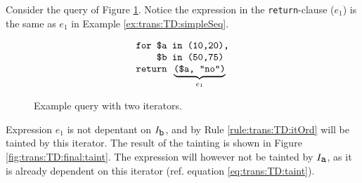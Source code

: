 \begin{myExample}
Consider the query of Figure \ref{fig:trans:TD:dblFor}. Notice the expression
in the \texttt{return}-clause ($e_1$) is the same as $e_1$ in Example \ref{ex:trans:TD:simpleSeq}.

\begin{figure}[h]
\begin{equation*}
\begin{array}{l}
\mbox{\texttt{for \$a in (10,20),}} \\
\mbox{\texttt{\phantom{abcd}\$b in (50,75)}} \\ 
\mbox{\texttt{return }}\underbrace{\mbox{\texttt{(\$a, "no")}} }_{e_{1}}
\end{array}
\end{equation*}
\caption{Example query with two iterators. \label{fig:trans:TD:dblFor}}
\end{figure}

Expression $e_{1}$ is not depentant on $I_{\mbox{\texttt{b}}}$, and by Rule \ref{rule:trans:TD:itOrd} will be
tainted by this iterator. The result of the tainting is shown in Figure \ref{fig:trans:TD:final:taint}. The
expression will however not be tainted by $I_{\mbox{\texttt{a}}}$, as it is already dependent on this iterator
(ref. equation \ref{eq:trans:TD:taint}).


\end{myExample}
